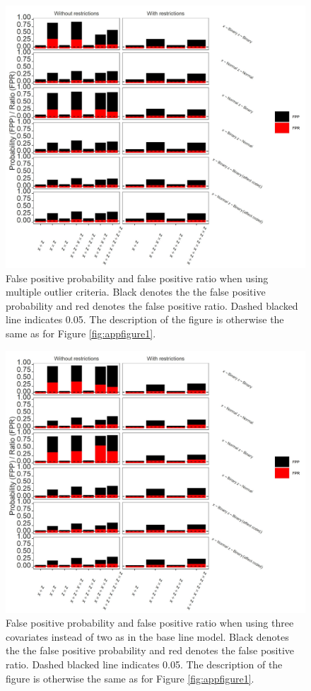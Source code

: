 \begin{figure}[hbt!]
\includegraphics[scale=0.95]{R/Analysis/Result/Figures/Figure1BSI.jpeg}
\centering
\caption{False positive probability and false positive ratio when using multiple outlier criteria. Black denotes the the false positive probability and red denotes the false positive ratio. Dashed blacked line indicates 0.05. The description of the figure is otherwise the same as for Figure \ref{fig:appfigure1}.
}
\label{fig:appfigure4}
\end{figure}

\begin{figure}[hbt!]
\includegraphics[scale=0.95]{R/Analysis/Result/Figures/Figure1CSI.jpeg}
\centering
\caption{False positive probability and false positive ratio when using three covariates instead of two as in the base line model. Black denotes the the false positive probability and red denotes the false positive ratio. Dashed blacked line indicates 0.05. The description of the figure is otherwise the same as for Figure \ref{fig:appfigure1}.
}
\label{fig:appfigure5}
\end{figure}

